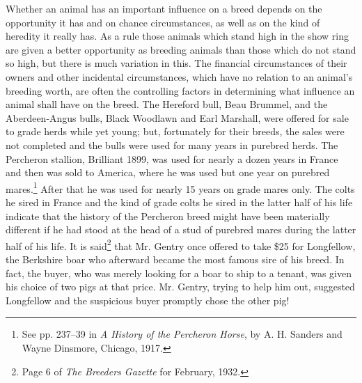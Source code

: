 Whether an animal has an important influence on a breed depends
on the opportunity it has and on chance circumstances, as well as on
the kind of heredity it really has. As a rule those animals which stand
high in the show ring are given a better opportunity as breeding animals
than those which do not stand so high, but there is much variation
in this. The financial circumstances of their owners and other incidental
circumstances, which have no relation to an animal's breeding worth,
are often the controlling factors in determining what influence an animal
shall have on the breed. The Hereford bull, Beau Brummel, and
the Aberdeen-Angus bulls, Black Woodlawn and Earl Marshall, were
offered for sale to grade herds while yet young; but, fortunately for
their breeds, the sales were not completed and the bulls were used for
many years in purebred herds. The Percheron stallion, Brilliant 1899,
was used for nearly a dozen years in France and then was sold to America,
where he was used but one year on purebred mares.\footnote{See pp.
237--39 in \textit{A History of the Percheron Horse}, by A. H. Sanders and
Wayne Dinsmore, Chicago, 1917.} After that he
was used for nearly 15 years on grade mares only. The colts he sired in
France and the kind of grade colts he sired in the latter half of his life
indicate that the history of the Percheron breed might have been materially
different if he had stood at the head of a stud of purebred mares
during the latter half of his life. It is said\footnote{Page 6 of
\textit{The Breeders Gazette} for February, 1932.} that Mr. Gentry once offered
to take \$25 for Longfellow, the Berkshire boar who afterward became
the most famous sire of his breed. In fact, the buyer, who was merely
looking for a boar to ship to a tenant, was given his choice of two pigs
at that price. Mr. Gentry, trying to help him out, suggested Longfellow
and the suspicious buyer promptly chose the other pig!

